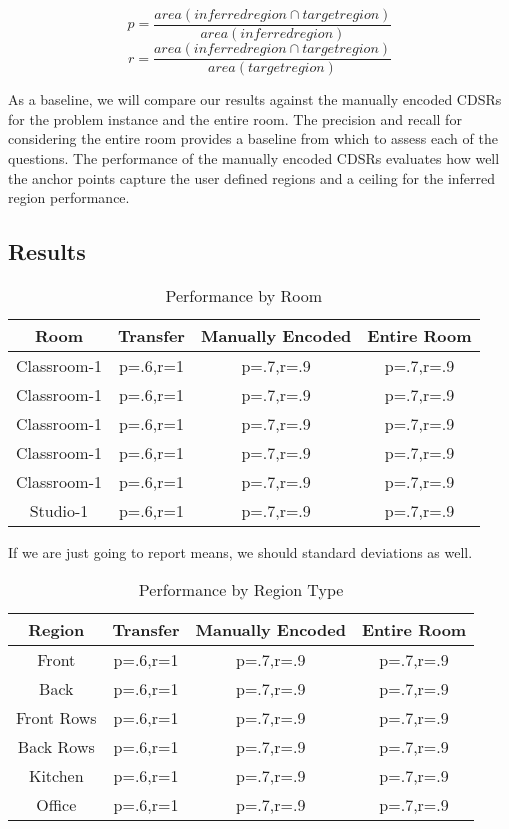 \begin{equation}
	p=\frac{area(inferred region \cap target region)}{area(inferred region)}
\end{equation}
\begin{equation}
	r=\frac{area(inferred region \cap target region)}{area(target region)}
\end{equation}


As a baseline, we will compare our results against the manually encoded CDSRs for the problem instance and the entire room. The precision and recall for considering the entire room provides a baseline from which to assess each of the questions. The performance of the manually encoded CDSRs evaluates how well the anchor points capture the user defined regions and a ceiling for the inferred region performance.



\subsection{Results}
\begin{table}
\caption{Performance by Room}
\begin{tabular}{|c|c|c|c|}
\hline
Room & Transfer & Manually Encoded & Entire Room \\
\hline
Classroom-1 & p=.6,r=1 & p=.7,r=.9 & p=.7,r=.9 \\
Classroom-1 & p=.6,r=1 & p=.7,r=.9 & p=.7,r=.9 \\
Classroom-1 & p=.6,r=1 & p=.7,r=.9 & p=.7,r=.9 \\
Classroom-1 & p=.6,r=1 & p=.7,r=.9 & p=.7,r=.9 \\
Classroom-1 & p=.6,r=1 & p=.7,r=.9 & p=.7,r=.9 \\
Studio-1 & p=.6,r=1 & p=.7,r=.9 & p=.7,r=.9 \\
\hline
\end{tabular}
\end{table}



If we are just going to report means, we should standard deviations as well. %

\begin{table}
\caption{Performance by Region Type}
\begin{tabular}{|c|c|c|c|}
\hline
Region & Transfer & Manually Encoded & Entire Room \\
\hline
Front & p=.6,r=1 & p=.7,r=.9 & p=.7,r=.9 \\
Back & p=.6,r=1 & p=.7,r=.9 & p=.7,r=.9 \\
Front Rows & p=.6,r=1 & p=.7,r=.9 & p=.7,r=.9 \\
Back Rows & p=.6,r=1 & p=.7,r=.9 & p=.7,r=.9 \\
Kitchen & p=.6,r=1 & p=.7,r=.9 & p=.7,r=.9 \\
Office & p=.6,r=1 & p=.7,r=.9 & p=.7,r=.9 \\
\hline
\end{tabular}
\end{table}

